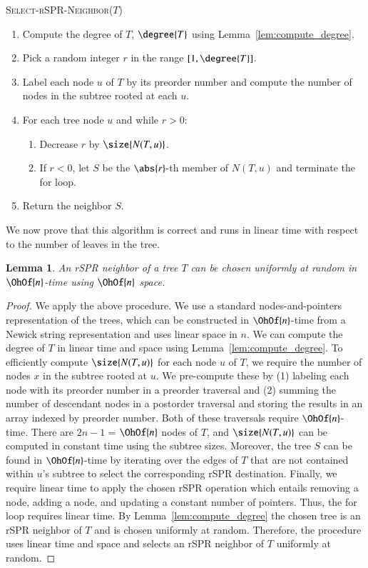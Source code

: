 \documentclass[]{elsarticle}
\newtheorem{lem}[thm]{Lemma}
\begin{document}
\vspace{1em}
\textsc{Select-rSPR-Neighbor($T$)}
\begin{enumerate}[label={\arabic*}.]
	\item	Compute the degree of $T$, $\degree{T}$ using Lemma~\ref{lem:compute_degree}.
	\item Pick a random integer $r$ in the range $[1,\degree{T}]$.
	\item Label each node $u$ of $T$ by its preorder number and compute the number of nodes in the subtree rooted at each $u$.
\item For each tree node $u$ and while $r > 0$:
	\begin{enumerate}
		\item Decrease $r$ by $\size{N(T,u)}$.
		\item If $r < 0$, let $S$ be the $\abs{r}$-th member of $N(T,u)$ and terminate the for loop.
	\end{enumerate}
\item Return the neighbor $S$.
\end{enumerate}

We now prove that this algorithm is correct and runs in linear time with respect to the number of leaves in the tree.

\begin{lem}
	\label{lem:select_random_neighbor}
	An rSPR neighbor of a tree $T$ can be chosen uniformly at random in $\OhOf{n}$-time using $\OhOf{n}$ space.
\end{lem}
\begin{proof}
	We apply the above procedure.
	We use a standard nodes-and-pointers representation of the trees, which can be constructed in $\OhOf{n}$-time from a Newick string representation and uses linear space in $n$.
	We can compute the degree of $T$ in linear time and space using Lemma~\ref{lem:compute_degree}.
	To efficiently compute $\size{N(T,u)}$ for each node $u$ of $T$, we require the number of nodes $x$ in the subtree rooted at $u$.
	We pre-compute these by (1) labeling each node with its preorder number in a preorder traversal and (2) summing the number of descendant nodes in a postorder traversal and storing the results in an array indexed by preorder number.
	Both of these traversals require $\OhOf{n}$-time.
	There are $2n-1$ = $\OhOf{n}$ nodes of $T$, and $\size{N(T,u)}$ can be computed in constant time using the subtree sizes.
	Moreover, the tree $S$ can be found in $\OhOf{n}$-time by iterating over the edges of $T$ that are not contained within $u$'s subtree to select the corresponding rSPR destination.
	Finally, we require linear time to apply the chosen rSPR operation which entails removing a node, adding a node, and updating a constant number of pointers.
	Thus, the for loop requires linear time.
	By Lemma~\ref{lem:compute_degree} the chosen tree is an rSPR neighbor of $T$ and is chosen uniformly at random.
	Therefore, the procedure uses linear time and space and selects an rSPR neighbor of $T$ uniformly at random.
\end{proof}
\end{document}
